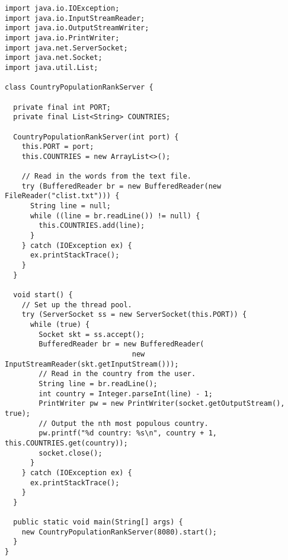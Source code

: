 \begin{lstlisting}[language=MyJava]
import java.io.IOException;
import java.io.InputStreamReader;
import java.io.OutputStreamWriter;
import java.io.PrintWriter;
import java.net.ServerSocket;
import java.net.Socket;
import java.util.List;

class CountryPopulationRankServer {

  private final int PORT;
  private final List<String> COUNTRIES;

  CountryPopulationRankServer(int port) {
    this.PORT = port;
    this.COUNTRIES = new ArrayList<>();

    // Read in the words from the text file.
    try (BufferedReader br = new BufferedReader(new FileReader("clist.txt"))) {
      String line = null;
      while ((line = br.readLine()) != null) { 
        this.COUNTRIES.add(line); 
      }
    } catch (IOException ex) { 
      ex.printStackTrace(); 
    }
  }

  void start() {
    // Set up the thread pool.
    try (ServerSocket ss = new ServerSocket(this.PORT)) {
      while (true) {
        Socket skt = ss.accept();
        BufferedReader br = new BufferedReader(
                              new InputStreamReader(skt.getInputStream()));
        // Read in the country from the user.
        String line = br.readLine();
        int country = Integer.parseInt(line) - 1;
        PrintWriter pw = new PrintWriter(socket.getOutputStream(), true);
        // Output the nth most populous country.
        pw.printf("%d country: %s\n", country + 1, this.COUNTRIES.get(country));
        socket.close();
      }
    } catch (IOException ex) { 
      ex.printStackTrace(); 
    }
  }

  public static void main(String[] args) {
    new CountryPopulationRankServer(8080).start();
  }
}
\end{lstlisting}

